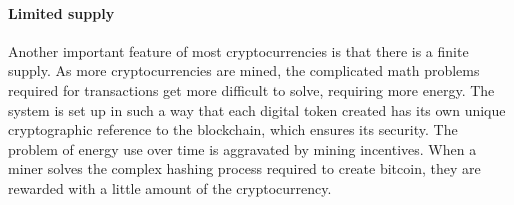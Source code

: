 \documentclass[10pt,twocolumn]{article}
\begin{document}
\paragraph{Limited supply}

Another important feature of most cryptocurrencies is that there is a finite supply. As more cryptocurrencies are mined, the complicated math problems required for transactions get more difficult to solve, requiring more energy.\cite{Bariviera} The system is set up in such a way that each digital token created has its own unique cryptographic reference to the blockchain, which ensures its security. The problem of energy use over time is aggravated by mining incentives. When a miner solves the complex hashing process required to create bitcoin, they are rewarded with a little amount of the cryptocurrency.



\printbibliography
\end{document}

